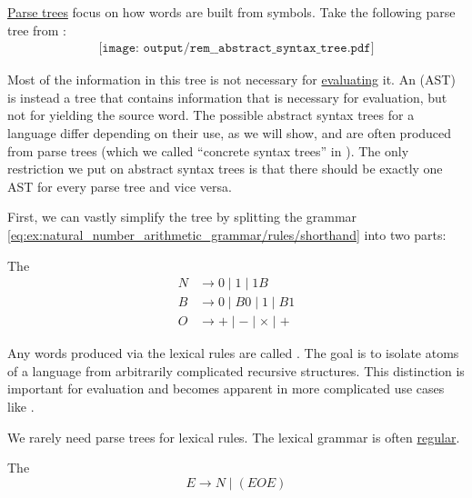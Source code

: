 \begin{remark}\label{rem:abstract_syntax_tree}
  \hyperref[def:parse_tree]{Parse trees} focus on how words are built from symbols. Take the following parse tree from :
  \begin{equation}\label{eq:rem:abstract_syntax_tree/base}
    \begin{aligned}
      \texttt{[image: output/rem\_\_abstract\_syntax\_tree.pdf]}
    \end{aligned}
  \end{equation}

  Most of the information in this tree is not necessary for \hyperref[rem:evaluation]{evaluating} it. An  (AST) is instead a tree that contains information that is necessary for evaluation, but not for yielding the source word. The possible abstract syntax trees for a language differ depending on their use, as we will show, and are often produced from parse trees (which we called \enquote{concrete syntax trees} in ). The only restriction we put on abstract syntax trees is that there should be exactly one AST for every parse tree and vice versa.

  First, we can vastly simplify the tree by splitting the grammar \eqref{eq:ex:natural_number_arithmetic_grammar/rules/shorthand} into two parts:
  \begin{thmenum}
     The 
    \begin{equation*}
      \begin{aligned}
        N &\to 0 \mid 1 \mid 1 B \\
        B &\to 0 \mid B 0 \mid 1 \mid B 1 \\
        O &\to + \mid - \mid \times \mid +
      \end{aligned}
    \end{equation*}

    Any words produced via the lexical rules are called . The goal is to isolate atoms of a language from arbitrarily complicated recursive structures. This distinction is important for evaluation and becomes apparent in more complicated use cases like .

    We rarely need parse trees for lexical rules. The lexical grammar is often \hyperref[def:chomsky_hierarchy/regular]{regular}.

     The 
    \begin{equation*}
      E \to N \mid (E O E)
    \end{equation*}


\end{thmenum}
\end{remark}
